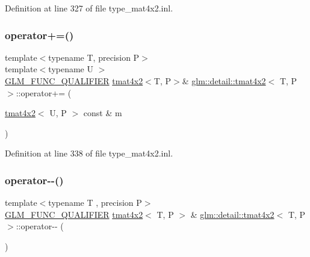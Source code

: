 Definition at line 327 of file type\+\_\+mat4x2.\+inl.

\mbox{\label{structglm_1_1detail_1_1tmat4x2_a39682439b0540114d8a90dfb96ff09e7}} 
\subsubsection{\texorpdfstring{operator+=()}{operator+=()}\hspace{0.1cm}{\footnotesize\ttfamily [4/4]}}
{\footnotesize\ttfamily template$<$typename T, precision P$>$ \\
template$<$typename U $>$ \\
\hyperlink{setup_8hpp_a33fdea6f91c5f834105f7415e2a64407}{G\+L\+M\+\_\+\+F\+U\+N\+C\+\_\+\+Q\+U\+A\+L\+I\+F\+I\+ER} \hyperlink{structglm_1_1detail_1_1tmat4x2}{tmat4x2}$<$T, P$>$\& \hyperlink{structglm_1_1detail_1_1tmat4x2}{glm\+::detail\+::tmat4x2}$<$ T, P $>$\+::operator+= (\begin{DoxyParamCaption}\item[{\hyperlink{structglm_1_1detail_1_1tmat4x2}{tmat4x2}$<$ U, P $>$ const \&}]{m }\end{DoxyParamCaption})}



Definition at line 338 of file type\+\_\+mat4x2.\+inl.

\mbox{\label{structglm_1_1detail_1_1tmat4x2_ad648e4a3b4f36d702b584414291734b0}} 
\subsubsection{\texorpdfstring{operator-\/-\/()}{operator--()}\hspace{0.1cm}{\footnotesize\ttfamily [1/2]}}
{\footnotesize\ttfamily template$<$typename T , precision P$>$ \\
\hyperlink{setup_8hpp_a33fdea6f91c5f834105f7415e2a64407}{G\+L\+M\+\_\+\+F\+U\+N\+C\+\_\+\+Q\+U\+A\+L\+I\+F\+I\+ER} \hyperlink{structglm_1_1detail_1_1tmat4x2}{tmat4x2}$<$ T, P $>$ \& \hyperlink{structglm_1_1detail_1_1tmat4x2}{glm\+::detail\+::tmat4x2}$<$ T, P $>$\+::operator-\/-\/ (\begin{DoxyParamCaption}{ }\end{DoxyParamCaption})}



